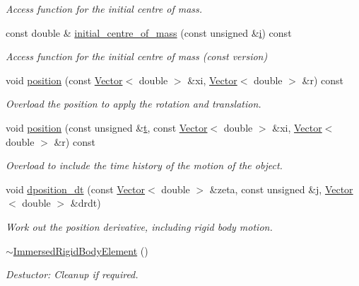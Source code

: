 \begin{DoxyCompactItemize}
\begin{DoxyCompactList}\small\item\em Access function for the initial centre of mass. \end{DoxyCompactList}\item 
const double \& \hyperlink{classoomph_1_1ImmersedRigidBodyElement_af19a740e7de78418af938ea8f23e5a86}{initial\+\_\+centre\+\_\+of\+\_\+mass} (const unsigned \&\hyperlink{cfortran_8h_adb50e893b86b3e55e751a42eab3cba82}{i}) const
\begin{DoxyCompactList}\small\item\em Access function for the initial centre of mass (const version) \end{DoxyCompactList}\item 
void \hyperlink{classoomph_1_1ImmersedRigidBodyElement_a14f5acb186ecd1168dfa08dcf242c538}{position} (const \hyperlink{classoomph_1_1Vector}{Vector}$<$ double $>$ \&xi, \hyperlink{classoomph_1_1Vector}{Vector}$<$ double $>$ \&r) const
\begin{DoxyCompactList}\small\item\em Overload the position to apply the rotation and translation. \end{DoxyCompactList}\item 
void \hyperlink{classoomph_1_1ImmersedRigidBodyElement_aca95759d96758c7a4fc81dece7768e9d}{position} (const unsigned \&\hyperlink{cfortran_8h_af6f0bd3dc13317f895c91323c25c2b8f}{t}, const \hyperlink{classoomph_1_1Vector}{Vector}$<$ double $>$ \&xi, \hyperlink{classoomph_1_1Vector}{Vector}$<$ double $>$ \&r) const
\begin{DoxyCompactList}\small\item\em Overload to include the time history of the motion of the object. \end{DoxyCompactList}\item 
void \hyperlink{classoomph_1_1ImmersedRigidBodyElement_a3b25cfe303aa51f26bd27312abccbba4}{dposition\+\_\+dt} (const \hyperlink{classoomph_1_1Vector}{Vector}$<$ double $>$ \&zeta, const unsigned \&j, \hyperlink{classoomph_1_1Vector}{Vector}$<$ double $>$ \&drdt)
\begin{DoxyCompactList}\small\item\em Work out the position derivative, including rigid body motion. \end{DoxyCompactList}\item 
\hyperlink{classoomph_1_1ImmersedRigidBodyElement_a60dd9497b3e0713719dfb4b08989eb4c}{$\sim$\+Immersed\+Rigid\+Body\+Element} ()
\begin{DoxyCompactList}\small\item\em Destuctor\+: Cleanup if required. \end{DoxyCompactList}\item 

\end{DoxyCompactItemize}

